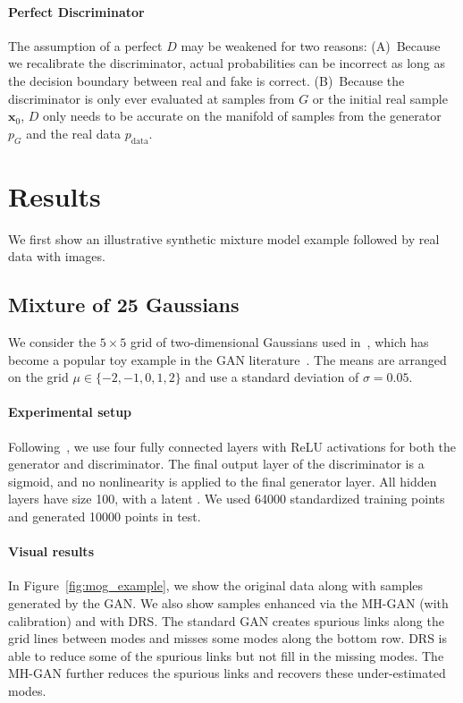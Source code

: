 \documentclass{article}
\renewcommand{\vec}[1]{{\boldsymbol{\mathbf{#1}}}} %
\newcommand{\R}{\mathbb{R}}
\newcommand{\PG}{{p_G}}
\newcommand{\PR}{{p_{\textrm{data}}}}
\begin{document}
\paragraph{Perfect Discriminator}
The assumption of a perfect $D$ may be weakened for two reasons:
(A)~Because we recalibrate the discriminator, actual probabilities can be incorrect as long as the decision boundary between real and fake is correct.
(B)~Because the discriminator is only ever evaluated at samples from $G$ or the initial real sample $\vec x_0$, $D$ only needs to be accurate on the manifold of samples from the generator $\PG$ and the real data $\PR$.





\section{Results}
\label{sec:Results}

We first show an illustrative synthetic mixture model example followed by real data with images.

\subsection{Mixture of 25 Gaussians}

We consider the $5 \times 5$ grid of two-dimensional Gaussians used in~\citet{Azadi2018}, which has become a popular toy example in the GAN literature~\citep{Dumoulin2016}.
The means are arranged on the grid $\mu \in \{{-2},{-1},0,1,2\}$ and use a standard deviation of $\sigma = 0.05$.

\paragraph{Experimental setup}
Following~\citet{Azadi2018}, we use four fully connected layers with ReLU activations for both the generator and discriminator.
The final output layer of the discriminator is a sigmoid, and no nonlinearity is applied to the final generator layer.
All hidden layers have size 100, with a latent \smash{$\vec z \in \R^2$}.
We used \num{64000} standardized training points and generated \num{10000} points in test.

\paragraph{Visual results}
In Figure~\ref{fig:mog_example}, we show the original data along with samples generated by the GAN\@.
We also show samples enhanced via the MH-GAN (with calibration) and with DRS\@.
The standard GAN creates spurious links along the grid lines between modes and misses some modes along the bottom row.
DRS is able to reduce some of the spurious links but not fill in the missing modes.
The MH-GAN further reduces the spurious links and recovers these under-estimated modes.
\end{document}
